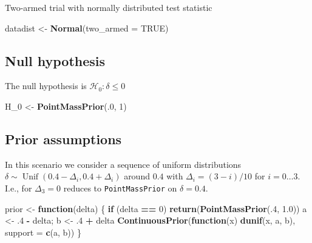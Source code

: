 \documentclass[]{book}
\newenvironment{Shaded}{\begin{snugshade}}{\end{snugshade}}
\newcommand{\ControlFlowTok}[1]{\textcolor[rgb]{0.13,0.29,0.53}{\textbf{#1}}}
\newcommand{\DataTypeTok}[1]{\textcolor[rgb]{0.13,0.29,0.53}{#1}}
\newcommand{\DecValTok}[1]{\textcolor[rgb]{0.00,0.00,0.81}{#1}}
\newcommand{\FloatTok}[1]{\textcolor[rgb]{0.00,0.00,0.81}{#1}}
\newcommand{\KeywordTok}[1]{\textcolor[rgb]{0.13,0.29,0.53}{\textbf{#1}}}
\newcommand{\NormalTok}[1]{#1}
\newcommand{\OperatorTok}[1]{\textcolor[rgb]{0.81,0.36,0.00}{\textbf{#1}}}
\newcommand{\OtherTok}[1]{\textcolor[rgb]{0.56,0.35,0.01}{#1}}
\newcommand{\StringTok}[1]{\textcolor[rgb]{0.31,0.60,0.02}{#1}}
\begin{document}
Two-armed trial with normally distributed test statistic

\begin{Shaded}
\begin{Highlighting}[]
\NormalTok{datadist <-}\StringTok{ }\KeywordTok{Normal}\NormalTok{(}\DataTypeTok{two_armed =} \OtherTok{TRUE}\NormalTok{)}
\end{Highlighting}
\end{Shaded}

\hypertarget{null-hypothesis-2}{%
\subsection{Null hypothesis}\label{null-hypothesis-2}}

The null hypothesis is \(\mathcal{H}_0:\delta \leq 0\)

\begin{Shaded}
\begin{Highlighting}[]
\NormalTok{H_}\DecValTok{0}\NormalTok{ <-}\StringTok{ }\KeywordTok{PointMassPrior}\NormalTok{(.}\DecValTok{0}\NormalTok{, }\DecValTok{1}\NormalTok{)}
\end{Highlighting}
\end{Shaded}

\hypertarget{prior-assumptions-2}{%
\subsection{Prior assumptions}\label{prior-assumptions-2}}

In this scenario we consider a sequence of uniform distributions
\(\delta\sim\operatorname{Unif}(0.4 - \Delta_i, 0.4 + \Delta_i)\)
around \(0.4\) with \(\Delta_i=(3 - i)/10\) for \(i=0\ldots 3\).
I.e., for \(\Delta_3=0\) reduces to \texttt{PointMassPrior} on \(\delta=0.4\).

\begin{Shaded}
\begin{Highlighting}[]
\NormalTok{prior <-}\StringTok{ }\ControlFlowTok{function}\NormalTok{(delta) \{}
    \ControlFlowTok{if}\NormalTok{ (delta }\OperatorTok{==}\StringTok{ }\DecValTok{0}\NormalTok{)}
        \KeywordTok{return}\NormalTok{(}\KeywordTok{PointMassPrior}\NormalTok{(.}\DecValTok{4}\NormalTok{, }\FloatTok{1.0}\NormalTok{))}
\NormalTok{    a <-}\StringTok{ }\FloatTok{.4} \OperatorTok{-}\StringTok{ }\NormalTok{delta; b <-}\StringTok{ }\FloatTok{.4} \OperatorTok{+}\StringTok{ }\NormalTok{delta}
    \KeywordTok{ContinuousPrior}\NormalTok{(}\ControlFlowTok{function}\NormalTok{(x) }\KeywordTok{dunif}\NormalTok{(x, a, b), }\DataTypeTok{support =} \KeywordTok{c}\NormalTok{(a, b))}
\NormalTok{\}}
\end{Highlighting}
\end{Shaded}
\end{document}
